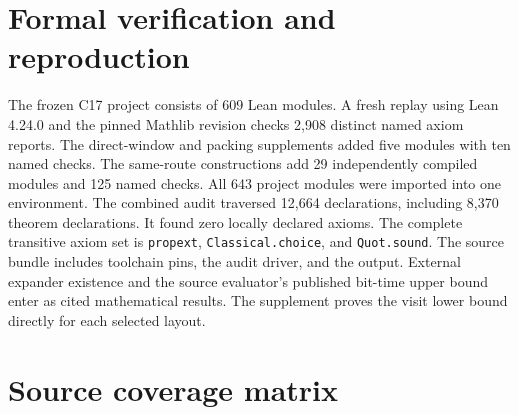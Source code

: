 \documentclass[
  11pt,
]{article}
\begin{document}
\section{Formal verification and reproduction}\label{formal-verification-and-statement-coverage}
The frozen C17 project consists of 609 Lean modules. A fresh replay using Lean 4.24.0 and the pinned Mathlib revision checks 2,908 distinct named axiom reports. The direct-window and packing supplements added five modules with ten named checks. The same-route constructions add 29 independently compiled modules and 125 named checks. All 643 project modules were imported into one environment. The combined audit traversed 12,664 declarations, including 8,370 theorem declarations. It found zero locally declared axioms. The complete transitive axiom set is \texttt{propext}, \texttt{Classical.choice}, and \texttt{Quot.sound}. The source bundle includes toolchain pins, the audit driver, and the output. External expander existence and the source evaluator's published bit-time upper bound enter as cited mathematical results. The supplement proves the visit lower bound directly for each selected layout.

\section{Source coverage matrix}\label{source-coverage-matrix}
\end{document}
